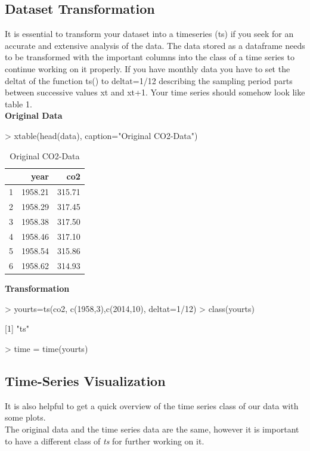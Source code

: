 \documentclass[10pt, a4paper]{article} %
\begin{document}
\subsection{Dataset Transformation}
\noindent It is essential to transform your dataset into a timeseries (ts) if you seek for an accurate and extensive analysis of the data.
The data stored as a dataframe needs to be transformed with the important columns into the class of a time series to continue working on it properly. If you have monthly data you have to set the deltat of the function ts() to deltat=1/12 describing the sampling period parts between successive values xt and xt+1. Your time series should somehow look like table 1.\\
\noindent \textbf{Original Data}\\
\begin{Schunk}
\begin{Sinput}
> xtable(head(data), caption="Original CO2-Data")
\end{Sinput}
\begin{table}[ht]
\centering
\begin{tabular}{rrr}
  \hline
 & year & co2 \\ 
  \hline
1 & 1958.21 & 315.71 \\ 
  2 & 1958.29 & 317.45 \\ 
  3 & 1958.38 & 317.50 \\ 
  4 & 1958.46 & 317.10 \\ 
  5 & 1958.54 & 315.86 \\ 
  6 & 1958.62 & 314.93 \\ 
   \hline
\end{tabular}
\caption{Original CO2-Data} 
\end{table}\end{Schunk}
\noindent \textbf{Transformation}\\
\begin{Schunk}
\begin{Sinput}
> yourts=ts(co2, c(1958,3),c(2014,10), deltat=1/12)
> class(yourts)
\end{Sinput}
[1] "ts"\begin{Sinput}
> time = time(yourts)
\end{Sinput}
\end{Schunk}

\subsection{Time-Series Visualization}%
It is  also helpful to get a quick overview of the time series class of our data with some plots.\\ 
The original data and the time series data are the same, however it is important to have a different class of \emph{ts} for further working on it. \\
\end{document}
